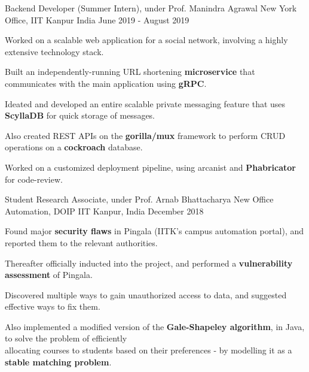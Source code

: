 \begin{cventries}
  \excventry
  {Backend Developer (Summer Intern), under Prof. Manindra Agrawal}
  {New York Office, IIT Kanpur}
  {India}
  {June 2019 - August 2019}
  {
    \begin{cvitems}
      \item Worked on a scalable web application for a social network, involving a highly extensive technology stack.
      \item Built an independently-running URL shortening \textbf{microservice} that communicates with the main application using \textbf{gRPC}.
      \item Ideated and developed an entire scalable private messaging feature that uses \textbf{ScyllaDB} for quick storage of messages.
      \item Also created REST APIs on the \textbf{gorilla/mux} framework to perform CRUD operations on a \textbf{cockroach} database.
      \item Worked on a customized deployment pipeline, using arcanist and \textbf{Phabricator} for code-review.
    \end{cvitems}
  }

  \excventry
  {Student Research Associate, under Prof. Arnab Bhattacharya}
  {New Office Automation, DOIP}
  {IIT Kanpur, India}
  {December 2018}
  {
    \begin{cvitems}
      \item Found major \textbf{security flaws} in Pingala (IITK's campus automation portal), and reported them to the relevant authorities.
      \item Thereafter officially inducted into the project, and performed a \textbf{vulnerability assessment} of Pingala.
      \item Discovered multiple ways to gain unauthorized access to data, and suggested effective ways to fix them.
      \item Also implemented a modified version of the \textbf{Gale-Shapeley algorithm}, in Java, to solve the problem of efficiently\\ allocating courses to students based on their preferences - by modelling it as a \textbf{stable matching problem}.
    \end{cvitems}
  }

\end{cventries}

